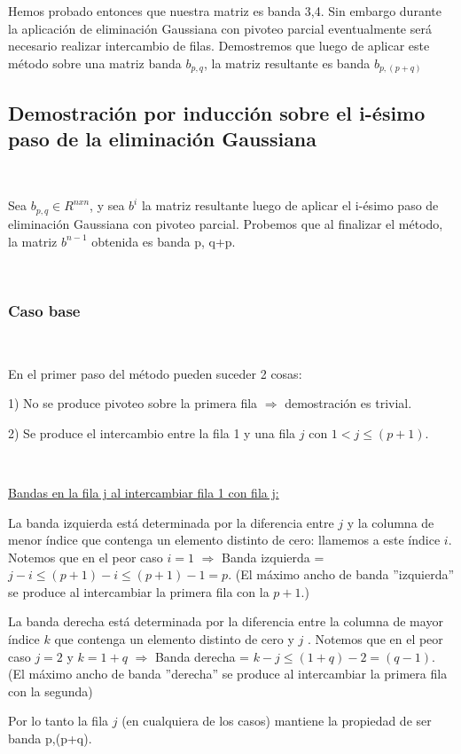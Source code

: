 Hemos probado entonces que nuestra matriz es banda 3,4. Sin embargo durante la aplicación 
de eliminación Gaussiana con pivoteo parcial eventualmente será necesario realizar intercambio de filas. 
Demostremos que luego de aplicar este método sobre una matriz banda $b_{p,q}$, la matriz resultante es banda $b_{p,(p+q)}$


\subsection{Demostración por inducción sobre el i-ésimo paso de la eliminación Gaussiana}

~

Sea $b_{p,q} \in R^{nxn}$, y sea $b^{i}$ la matriz resultante luego de aplicar el i-ésimo paso de eliminación Gaussiana con
pivoteo parcial. Probemos que al finalizar el método, la matriz $b^{n-1}$ obtenida es banda p, q+p.

~

\subsubsection{Caso base}

~

En el primer paso del método pueden suceder 2 cosas:

1) No se produce pivoteo sobre la primera fila $\Rightarrow$ demostración es trivial.

2) Se produce el intercambio entre la fila 1 y una fila $j$ con $1<j \leq (p+1)$. 

~

\underline{Bandas en la fila j al intercambiar fila 1 con fila j:}

La banda izquierda está determinada por la diferencia entre $j$ y la columna de menor índice que contenga un elemento distinto
de cero: llamemos a este índice $i$. Notemos que en el peor caso $i=1$ $\Rightarrow$ Banda izquierda = $j-i \leq (p+1) - i \leq
(p+1) - 1 = p$. (El máximo ancho de banda ''izquierda'' se produce al intercambiar la primera fila con la $p+1$.)

La banda derecha está determinada por la diferencia entre la columna de mayor índice $k$
que contenga un elemento distinto de cero y $j$ . Notemos que en el peor caso $j=2$ y $k =1+q$ $\Rightarrow$ Banda derecha =
$k-j \leq (1+q) -2 = (q-1)$. (El máximo ancho de banda ''derecha'' se produce al intercambiar la primera fila
con la segunda)

Por lo tanto la fila $j$ (en cualquiera de los casos) mantiene la propiedad de ser banda p,(p+q).


